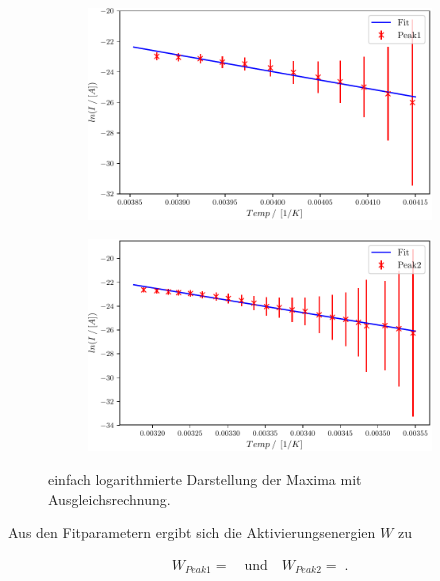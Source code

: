 \begin{figure}
\centering
\begin{subfigure}{.5\textwidth}
	\centering
	\includegraphics[width=1\textwidth]{build/2_Temp_current_peak_log_fit.pdf}
	\caption{}
	\label{fig:Auswertung_18}
\end{subfigure}%
\begin{subfigure}{.5\textwidth}
	\centering
	\includegraphics[width=1\textwidth]{build/2_Temp_current_peak2_log_fit.pdf}
	\caption{}
	\label{fig:Auswertung_19}
\end{subfigure}
\caption{einfach logarithmierte Darstellung der Maxima mit Ausgleichsrechnung.}
\label{fig:Auswertung_18_19}
\end{figure}

Aus den Fitparametern ergibt sich die Aktivierungsenergien $W$ zu

\begin{align}
	W_{Peak1} =   \quad \text{und} \quad W_{Peak2} = \;.
\end{align}


